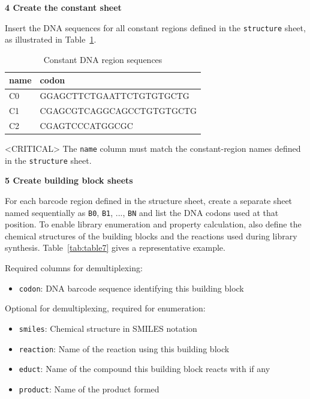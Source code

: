 \documentclass[pdflatex,sn-nature]{sn-jnl}
\newcommand{\protocolstep}[2]{\par\medskip\noindent\textbf{#1 \textbar{} #2}\par}
\begin{document}
\protocolstep{4}{Create the constant sheet}

Insert the DNA sequences for all constant regions defined in the \texttt{structure} sheet, as illustrated in Table~\ref{tab:table6}.

\begin{table}[htbp]
\centering
\caption{Constant DNA region sequences}
\label{tab:table6}
\begin{tabular}{ll}
\toprule
name & codon \\
\midrule
C0 & GGAGCTTCTGAATTCTGTGTGCTG \\
C1 & CGAGCGTCAGGCAGCCTGTGTGCTG \\
C2 & CGAGTCCCATGGCGC \\
\bottomrule
\end{tabular}
\end{table}
<CRITICAL> The \texttt{name} column must match the constant-region names defined in the \texttt{structure} sheet.

\protocolstep{5}{Create building block sheets}

For each barcode region defined in the structure sheet, create a separate sheet named sequentially as \texttt{B0}, \texttt{B1}, ..., \texttt{BN} and list the DNA codons used at that position. To enable library enumeration and property calculation, also define the chemical structures of the building blocks and the reactions used during library synthesis. Table~\ref{tab:table7} gives a representative example.

Required columns for demultiplexing:

\begin{itemize}
  \item \texttt{codon}: DNA barcode sequence identifying this building block
\end{itemize}
Optional for demultiplexing, required for enumeration:

\begin{itemize}
  \item \texttt{smiles}: Chemical structure in SMILES notation
  \item \texttt{reaction}: Name of the reaction using this building block
  \item \texttt{educt}: Name of the compound this building block reacts with if any
  \item \texttt{product}: Name of the product formed
\end{itemize}
\end{document}
